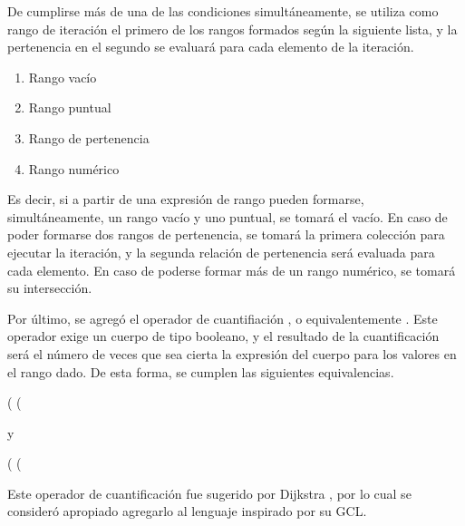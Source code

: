 De cumplirse más de una de las condiciones simultáneamente, se utiliza como
rango de iteración el primero de los rangos formados según la siguiente lista, y
la pertenencia en el segundo se evaluará para cada elemento de la iteración.

\begin{enumerate}
  \item Rango vacío
  \item Rango puntual
  \item Rango de pertenencia
  \item Rango numérico
\end{enumerate}

Es decir, si a partir de una expresión de rango pueden formarse,
simultáneamente, un rango vacío y uno puntual, se tomará el vacío. En caso de
poder formarse dos rangos de pertenencia, se tomará la primera colección para
ejecutar la iteración, y la segunda relación de pertenencia será evaluada para
cada elemento. En caso de poderse formar más de un rango numérico, se tomará su
intersección.

Por último, se agregó el operador de cuantifiación , o
equivalentemente \ingra{#}. Este operador exige un cuerpo de tipo booleano, y el
resultado de la cuantificación será el número de veces que sea cierta la
expresión del cuerpo para los valores en el rango dado. De esta forma, se
cumplen las siguientes equivalencias.

\begin{gracielacode}
(%
    (%
\end{gracielacode}

y

\begin{gracielacode}
(%
    (%
\end{gracielacode}

Este operador de cuantificación fue sugerido por Dijkstra
,
por lo cual se consideró apropiado agregarlo al lenguaje inspirado por su GCL.


